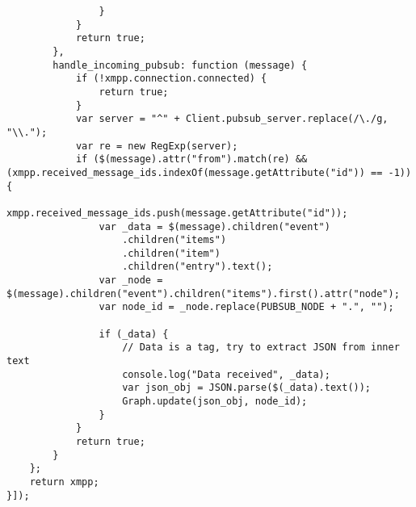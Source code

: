 \begin{lstlisting}
                }
            }
            return true;
        },
        handle_incoming_pubsub: function (message) {
            if (!xmpp.connection.connected) {
                return true;
            }
            var server = "^" + Client.pubsub_server.replace(/\./g, "\\.");
            var re = new RegExp(server);
            if ($(message).attr("from").match(re) && (xmpp.received_message_ids.indexOf(message.getAttribute("id")) == -1)) {
                xmpp.received_message_ids.push(message.getAttribute("id"));
                var _data = $(message).children("event")
                    .children("items")
                    .children("item")
                    .children("entry").text();
                var _node = $(message).children("event").children("items").first().attr("node");
                var node_id = _node.replace(PUBSUB_NODE + ".", "");

                if (_data) {
                    // Data is a tag, try to extract JSON from inner text
                    console.log("Data received", _data);
                    var json_obj = JSON.parse($(_data).text());
                    Graph.update(json_obj, node_id);
                }
            }
            return true;
        }
    };
    return xmpp;
}]);
\end{lstlisting}